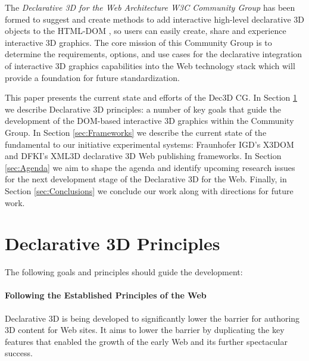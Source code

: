 \documentclass[review]{acmsiggraph}
\begin{document}
The \textit{Declarative 3D for the Web Architecture W3C Community Group} \cite{Dec3D-CG} has been formed to suggest and create methods to add interactive high-level declarative 3D objects to the HTML-DOM \cite{W3C-DOM}, so users can easily create, share and experience interactive 3D graphics. The core mission of this Community Group is to determine the requirements, options, and use cases for the declarative integration of interactive 3D graphics capabilities into the Web technology stack which will provide a foundation for future standardization.

This paper presents the current state and efforts of the Dec3D CG. In Section \ref{sec:Principles} we describe Declarative 3D principles: a number of key goals that guide the development of the DOM-based interactive 3D graphics within the Community Group.
In Section \ref{sec:Frameworks} we describe the current state of the fundamental to our initiative experimental systems: Fraunhofer IGD's X3DOM \cite{Behr2009} and DFKI's XML3D \cite{Sons2010} declarative 3D Web publishing frameworks.
In Section \ref{sec:Agenda} we aim to shape the agenda and identify upcoming research issues for the next development stage of the Declarative 3D for the Web. Finally, in Section \ref{sec:Conclusions} we conclude our work along with directions for future work.


\section{Declarative 3D Principles}
\label{sec:Principles}

The following goals and principles should guide the development:

\paragraph{Following the Established Principles of the Web}
Declarative 3D is being developed to significantly lower the barrier for authoring 3D content for Web sites. It aims to lower the barrier by duplicating the key features that enabled the growth of the early Web and its further spectacular success.
\end{document}
